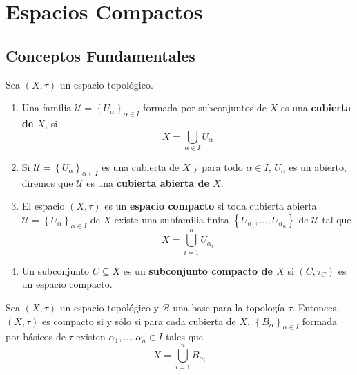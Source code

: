 \documentclass[12pt]{report}
\theoremstyle{largebreak}
\begin{document}
    \chapter{Espacios Compactos}

    \section{Conceptos Fundamentales}

    \begin{mydef}
        Sea $(X,\tau)$ un espacio topológico.
        \begin{enumerate}
            \item Una familia $\mathcal{U}=\left\{U_\alpha \right\}_{\alpha\in I}$ formada por subconjuntos de $X$ es una \textbf{cubierta de $X$}, si
            \begin{equation*}
                X=\bigcup_{\alpha\in I}U_\alpha
            \end{equation*}
            \item Si $\mathcal{U}=\left\{U_\alpha \right\}_{\alpha\in I}$ es una cubierta de $X$ y para todo $\alpha\in I$, $U_\alpha$ es un abierto, diremos que $\mathcal{U}$ es una \textbf{cubierta abierta de $X$}.
            \item El espacio $(X,\tau)$ es un \textbf{espacio compacto} si toda cubierta abierta $\mathcal{U}=\left\{U_\alpha \right\}_{\alpha\in I}$ de $X$ existe una subfamilia finita $\left\{U_{\alpha_1},...,U_{\alpha_n}\right\}$ de $\mathcal{U}$ tal que
            \begin{equation*}
                X=\bigcup_{i=1}^n U_{\alpha_i}
            \end{equation*}
            \item Un subconjunto $C\subseteq X$ es un \textbf{subconjunto compacto de $X$} si $(C,\tau_C)$ es un espacio compacto.
        \end{enumerate}
    \end{mydef}

    \begin{propo}
        Sea $(X,\tau)$ un espacio topológico y $\mathcal{B}$ una base para la topología $\tau$. Entonces, $(X,\tau)$ es compacto si y sólo si para cada cubierta de $X$, $\left\{B_\alpha \right\}_{\alpha\in I}$ formada por básicos de $\tau$ existen $\alpha_1,...,\alpha_n\in I$ tales que
        \begin{equation*}
            X=\bigcup_{ i=1}^n B_{\alpha_i}
        \end{equation*}
    \end{propo}
\end{document}

